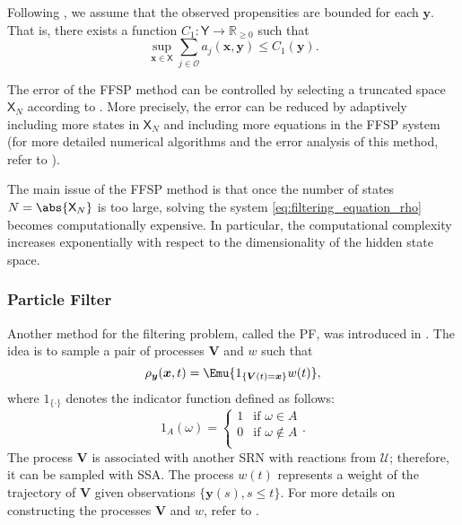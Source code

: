 Following \cite{DAmbrosio2022FFSP}, we assume that the observed propensities are bounded for each $\boldsymbol{y}$. That is, there exists a function $C_1 : \mathsf{Y} \to \mathbb{R}_{\geq 0}$ such that
\begin{equation}
    \label{eq:assumption_bound_propens} \tag{A2}
    \sup_{\boldsymbol{x} \in \mathsf{X}} \sum_{j \in \mathcal{O}} a_j \left( \boldsymbol{x}, \boldsymbol{y} \right) \leq C_1(\boldsymbol{y}) .
\end{equation}

The error of the \ac{FFSP} method can be controlled by selecting a truncated space $\mathsf{X}_N$ according to \cite[Theorems~2 and 4]{DAmbrosio2022FFSP}. More precisely, the error can be reduced by adaptively including more states in $\mathsf{X}_N$ and including more equations in the \ac{FFSP} system (for more detailed numerical algorithms and the error analysis of this method, refer to \cite{DAmbrosio2022FFSP}).

The main issue of the \ac{FFSP} method is that once the number of states $N = \abs{\mathsf{X}_N}$ is too large, solving the system \eqref{eq:filtering_equation_rho} becomes computationally expensive. In particular, the computational complexity increases exponentially with respect to the dimensionality of the hidden state space.





\subsubsection{Particle Filter}
\label{subsubsec:PF}
Another method for the filtering problem, called the \ac{PF}, was introduced in \cite{Rathinam2021PFwithExactState}. The idea is to sample a pair of processes $\boldsymbol{V}$ and $w$ such that 
\begin{equation}
    \label{eq:PF_expectation_rho}
    \rho_{\boldsymbol{y}} (\boldsymbol{x}, t) = \Emu{ 1_{\{ \boldsymbol{V}(t) = \boldsymbol{x} \}} w(t) },
\end{equation}
where $1_{\{\cdot\}}$ denotes the indicator function defined as follows:
$$
    1_{A} (\omega) = 
    \begin{cases}
        1 & \text{if } \omega \in A \\
        0 & \text{if } \omega \not \in A \\
    \end{cases} .
$$
The process $\boldsymbol{V}$ is associated with another \ac{SRN} with reactions from $\mathcal{U}$; therefore, it can be sampled with \ac{SSA}. The process $w(t)$ represents a weight of the trajectory of $\boldsymbol{V}$ given observations $\{ \boldsymbol{y}(s), s \leq t \}$. For more details on constructing the processes $\boldsymbol{V}$ and $w$, refer to \cite{Rathinam2021PFwithExactState}.

